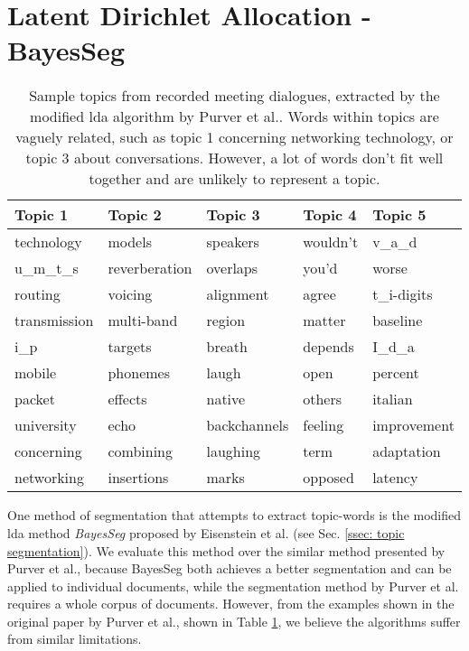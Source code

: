 \section[LDA BayesSeg]{Latent Dirichlet Allocation - BayesSeg \label{method: LDA}}
    \begin{table}
    \centering
    \begin{tabular}{lllll}
    \hline
    \textbf{Topic 1}   & \textbf{Topic 2}    & \textbf{Topic 3}   & \textbf{Topic 4} & \textbf{Topic 5}  \\ \hline
    technology   & models        & speakers     & wouldn't   & v\_a\_d     \\
    u\_m\_t\_s   & reverberation & overlaps     & you'd      & worse       \\
    routing      & voicing       & alignment    & agree      & t\_i-digits \\
    transmission & multi-band    & region       & matter     & baseline    \\
    i\_p         & targets       & breath       & depends    & I\_d\_a     \\
    mobile       & phonemes      & laugh        & open       & percent     \\
    packet       & effects       & native       & others     & italian     \\
    university   & echo          & backchannels & feeling    & improvement \\
    concerning   & combining     & laughing     & term       & adaptation  \\
    networking   & insertions    & marks        & opposed    & latency     \\ \hline
    \end{tabular}
    \caption{Sample topics from recorded meeting dialogues, extracted by the modified \gls{lda} algorithm by Purver et al.\cite{purver2006unsupervised}. Words within topics are vaguely related, such as topic 1 concerning networking technology, or topic 3 about conversations. However, a lot of words don't fit well together and are unlikely to represent a topic.}
    \label{table: modified lda topics}
    \end{table}

    One method of segmentation that attempts to extract topic-words is the modified \gls{lda} method \textit{BayesSeg} proposed by Eisenstein et al.\cite{eisenstein2008bayesian} (see Sec. \ref{ssec: topic segmentation}). We evaluate this method over the similar method presented by Purver et al.\cite{purver2006unsupervised}, because BayesSeg both achieves a better segmentation and can be applied to individual documents\cite{eisenstein2008bayesian}, while the segmentation method by Purver et al. requires a whole corpus of documents\cite{purver2006unsupervised}. %
    However, from the examples shown in the original paper by Purver et al.\cite{purver2006unsupervised}, shown in Table \ref{table: modified lda topics}, we believe the algorithms suffer from similar limitations.

